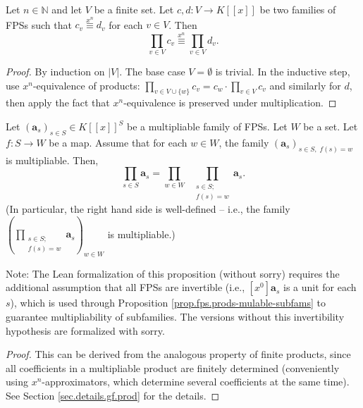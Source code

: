 \begin{lemma}
\label{lem.fps.prods-mulable-rules.SW1.lem1}
\leantarget
\leanok
Let $n\in\mathbb{N}$ and let $V$ be a finite set. Let $c,d : V \to K[[x]]$ be
two families of FPSs such that $c_v \overset{x^n}{\equiv} d_v$ for each $v\in V$.
Then
\[
\prod_{v\in V} c_v \overset{x^n}{\equiv} \prod_{v\in V} d_v.
\]
\end{lemma}

\begin{proof}
By induction on $|V|$. The base case $V = \emptyset$ is trivial. In the
inductive step, use $x^n$-equivalence of products:
$\prod_{v\in V \cup \{w\}} c_v = c_w \cdot \prod_{v\in V} c_v$
and similarly for $d$, then apply the fact that $x^n$-equivalence is preserved
under multiplication.
\end{proof}

\begin{proposition}
\label{prop.fps.prods-mulable-rules.SW1}
\leantarget
\leanok
Let $\left(\mathbf{a}_{s}\right)_{s\in S}\in K\left[\left[x\right]\right]^{S}$
be a multipliable family of FPSs. Let $W$ be a set. Let $f:S\rightarrow W$ be
a map. Assume that for each $w\in W$, the family $\left(\mathbf{a}_{s}\right)_{s\in
S,\; f(s)=w}$ is multipliable. Then,
\[
\prod_{s\in S}\mathbf{a}_{s}=\prod_{w\in W}\;\;\prod_{\substack{s\in S;\\
f(s)=w}}\mathbf{a}_{s}.
\]
(In particular, the right hand side is well-defined -- i.e., the family
$\left(\prod_{\substack{s\in S;\\ f(s)=w}}\mathbf{a}_{s}\right)_{w\in W}$ is
multipliable.)

Note: The Lean formalization of this proposition (without sorry) requires the
additional assumption that all FPSs are invertible (i.e., $[x^0]\mathbf{a}_s$
is a unit for each $s$), which is used through Proposition
\ref{prop.fps.prods-mulable-subfams} to guarantee multipliability of subfamilies.
The versions without this invertibility hypothesis are
formalized with sorry.
\end{proposition}

\begin{proof}
This can be derived from the analogous property of finite products, since all
coefficients in a multipliable product are finitely determined (conveniently
using $x^{n}$-approximators, which determine several coefficients at the same
time). See Section \ref{sec.details.gf.prod} for the details.
\end{proof}

